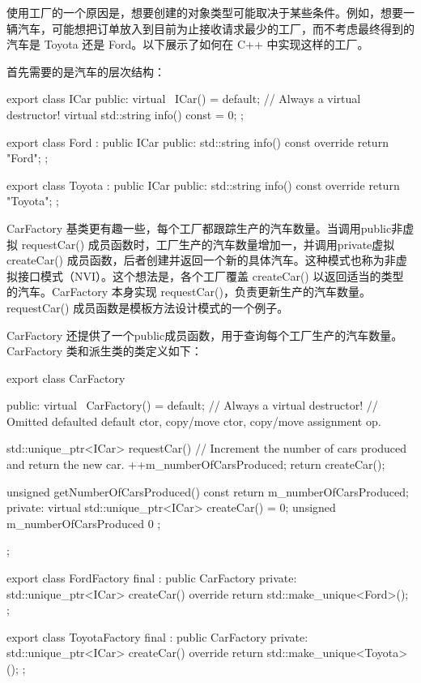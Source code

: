 
使用工厂的一个原因是，想要创建的对象类型可能取决于某些条件。例如，想要一辆汽车，可能想把订单放入到目前为止接收请求最少的工厂，而不考虑最终得到的汽车是 Toyota 还是 Ford。以下展示了如何在 C++ 中实现这样的工厂。

首先需要的是汽车的层次结构：

\begin{cpp}
export class ICar
{
    public:
        virtual ~ICar() = default; // Always a virtual destructor!
        virtual std::string info() const = 0;
};

export class Ford : public ICar
{
    public:
        std::string info() const override { return "Ford"; }
};

export class Toyota : public ICar
{
    public:
        std::string info() const override { return "Toyota"; }
};
\end{cpp}

CarFactory 基类更有趣一些，每个工厂都跟踪生产的汽车数量。当调用public非虚拟 requestCar() 成员函数时，工厂生产的汽车数量增加一，并调用private虚拟 createCar() 成员函数，后者创建并返回一个新的具体汽车。这种模式也称为非虚拟接口模式（NVI）。这个想法是，各个工厂覆盖 createCar() 以返回适当的类型的汽车。CarFactory 本身实现 requestCar()，负责更新生产的汽车数量。requestCar() 成员函数是模板方法设计模式的一个例子。

CarFactory 还提供了一个public成员函数，用于查询每个工厂生产的汽车数量。CarFactory 类和派生类的类定义如下：

\begin{cpp}
export class CarFactory
{
    public:
        virtual ~CarFactory() = default; // Always a virtual destructor!
        // Omitted defaulted default ctor, copy/move ctor, copy/move assignment op.

        std::unique_ptr<ICar> requestCar()
        {
            // Increment the number of cars produced and return the new car.
            ++m_numberOfCarsProduced;
            return createCar();
        }

        unsigned getNumberOfCarsProduced() const { return m_numberOfCarsProduced; }
    private:
        virtual std::unique_ptr<ICar> createCar() = 0;
        unsigned m_numberOfCarsProduced { 0 };
};

export class FordFactory final : public CarFactory
{
    private:
        std::unique_ptr<ICar> createCar() override {
            return std::make_unique<Ford>(); }
};

export class ToyotaFactory final : public CarFactory
{
    private:
        std::unique_ptr<ICar> createCar() override {
            return std::make_unique<Toyota>(); }
};
\end{cpp}

